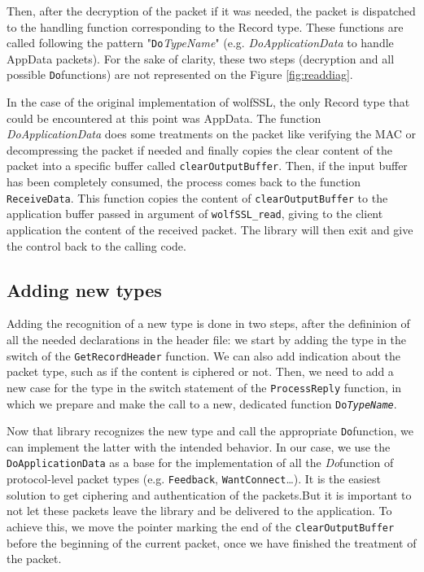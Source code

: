 Then, after the decryption of the packet if it was needed, the packet is dispatched to the handling function corresponding to the Record type. These functions are called following the pattern "\texttt{Do}\textit{TypeName}" (e.g. \textit{DoApplicationData} to handle AppData packets). For the sake of clarity, these two steps (decryption and all possible \texttt{Do}functions) are not represented on the Figure \ref{fig:readdiag}.


In the case of the original implementation of wolfSSL, the only Record type that could be encountered at this point was AppData. The function \textit{DoApplicationData} does some treatments on the packet like verifying the MAC or decompressing the packet if needed and finally copies the clear content of the packet into a specific buffer called \texttt{clearOutputBuffer}. Then, if the input buffer has been completely consumed, the process comes back to the function \texttt{ReceiveData}. This function copies the content of \texttt{clearOutputBuffer} to the application buffer passed in argument of \texttt{wolfSSL\_read}, giving to the client application the content of the received packet. The library will then exit and give the control back to the calling code.

\subsection{Adding new types}

Adding the recognition of a new type is done in two steps, after the defininion of all the needed declarations in the header file: we start by adding the type in the switch of the \texttt{GetRecordHeader} function. We can also add indication about the packet type, such as if the content is ciphered or not. Then, we need to add a new case for the type in the switch statement of the \texttt{ProcessReply} function, in which we prepare and make the call to a new, dedicated function \texttt{Do\textit{TypeName}}.

Now that library recognizes the new type and call the appropriate \texttt{Do}function, we can implement the latter with the intended behavior. In our case, we use the \texttt{DoApplicationData} as a base for the implementation of all the \textit{Do}function of protocol-level packet types (e.g. \texttt{Feedback}, \texttt{WantConnect}\dots). It is the easiest solution to get ciphering and authentication of the packets.But it is important to not let these packets leave the library and be delivered to the application. To achieve this, we move the pointer marking the end of the \texttt{clearOutputBuffer} before the beginning of the current packet, once we have finished the treatment of the packet.

